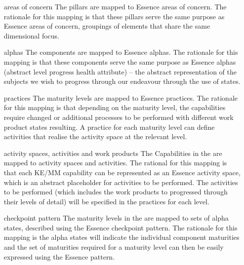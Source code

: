 \begin{itemize}[leftmargin=0.5in,font=\bfseries]

  \item [areas of concern]
  The  pillars are mapped to Essence areas of concern.
  The rationale for this mapping is that these  pillars serve the same purpose as
  Essence areas of concern, groupings of elements that share the same dimensional focus.

  \item [alphas]
  The  components are mapped to Essence alphas.
  The rationale for this mapping is that these  components serve the same purpose as
  Essence alphas (abstract level progress health attribute) -- the abstract representation of the subjects
  we wish to progress through our endeavour through the use of states.

  \item [practices]
  The  maturity levels are mapped to Essence practices.
  The rationale for this mapping is that depending on the maturity level, the  capabilities
  require changed or additional processes to be performed with different work product states resulting.
  A practice for each maturity level can define activities that realise the activity space at the relevant level.

  \item [activity spaces, activities and work products]
  The Capabilities in the  are mapped to activity spaces and activities.
  The rational for this mapping is that each KE/MM capability can be represented as an Essence activity space,
  which is an abstract placeholder for activities to be performed.
  The activities to be performed (which includes the work products to progressed through their levels of detail)
  will be specified in the practices for each level.

  \item [checkpoint pattern]
  The maturity levels in the  are mapped to sets of alpha states, described using the
  Essence checkpoint pattern.
  The rationale for this mapping is the alpha states will indicate the individual component maturities and
  the set of maturities required for a maturity level can then be easily expressed using the Essence pattern.

\end{itemize}
